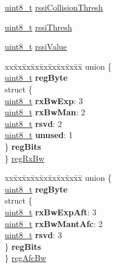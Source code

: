 \begin{DoxyCompactItemize}
\begin{tabbing}
\end{tabbing}\item 
\hyperlink{vl53l0x__types_8h_aba7bc1797add20fe3efdf37ced1182c5}{uint8\+\_\+t} \hyperlink{structFSK__Register__Map_a5be388872ba759407950694b59a20b59}{rssi\+Collision\+Thresh}
\item 
\hyperlink{vl53l0x__types_8h_aba7bc1797add20fe3efdf37ced1182c5}{uint8\+\_\+t} \hyperlink{structFSK__Register__Map_ab02ef8f045c4ee796367f7f523b7bb03}{rssi\+Thresh}
\item 
\hyperlink{vl53l0x__types_8h_aba7bc1797add20fe3efdf37ced1182c5}{uint8\+\_\+t} \hyperlink{structFSK__Register__Map_a6046db82f7b1712785f20bd45a5fad62}{rssi\+Value}
\item 
\begin{tabbing}
xx\=xx\=xx\=xx\=xx\=xx\=xx\=xx\=xx\=\kill
union \{\\
\>\hyperlink{vl53l0x__types_8h_aba7bc1797add20fe3efdf37ced1182c5}{uint8\_t} {\bfseries regByte}\\
\>struct \{\\
\>\>\hyperlink{vl53l0x__types_8h_aba7bc1797add20fe3efdf37ced1182c5}{uint8\_t} {\bfseries rxBwExp}: 3\\
\>\>\hyperlink{vl53l0x__types_8h_aba7bc1797add20fe3efdf37ced1182c5}{uint8\_t} {\bfseries rxBwMan}: 2\\
\>\>\hyperlink{vl53l0x__types_8h_aba7bc1797add20fe3efdf37ced1182c5}{uint8\_t} {\bfseries rsvd}: 2\\
\>\>\hyperlink{vl53l0x__types_8h_aba7bc1797add20fe3efdf37ced1182c5}{uint8\_t} {\bfseries unused}: 1\\
\>\} {\bfseries regBits}\\
\} \hyperlink{structFSK__Register__Map_a6f8092f055bc1503936b4b38857de567}{regRxBw}\\

\end{tabbing}\item 
\begin{tabbing}
xx\=xx\=xx\=xx\=xx\=xx\=xx\=xx\=xx\=\kill
union \{\\
\>\hyperlink{vl53l0x__types_8h_aba7bc1797add20fe3efdf37ced1182c5}{uint8\_t} {\bfseries regByte}\\
\>struct \{\\
\>\>\hyperlink{vl53l0x__types_8h_aba7bc1797add20fe3efdf37ced1182c5}{uint8\_t} {\bfseries rxBwExpAft}: 3\\
\>\>\hyperlink{vl53l0x__types_8h_aba7bc1797add20fe3efdf37ced1182c5}{uint8\_t} {\bfseries rxBwMantAfc}: 2\\
\>\>\hyperlink{vl53l0x__types_8h_aba7bc1797add20fe3efdf37ced1182c5}{uint8\_t} {\bfseries rsvd}: 3\\
\>\} {\bfseries regBits}\\
\} \hyperlink{structFSK__Register__Map_a7dc528c9517c2f8a0dca679fac734d65}{regAfcBw}\\


\end{tabbing}
\end{DoxyCompactItemize}
